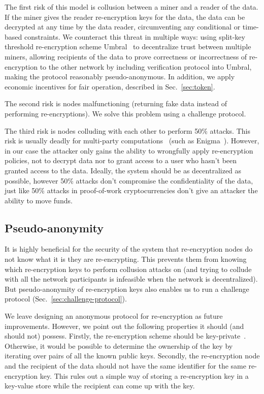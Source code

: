 \documentclass[longbibliography,nofootinbib]{revtex4-1}
\begin{document}
The first risk of this model is collusion between a miner and a reader of the data.
If the miner gives the reader re-encryption keys for the data,
the data can be decrypted at any time by the data reader, circumventing any conditional or time-based constraints.
We counteract this threat in multiple ways:
using split-key threshold re-encryption scheme Umbral~\cite{umbral-spec} to decentralize trust between multiple miners,
allowing recipients of the data to prove correctness or incorrectness of re-encryption to the other network by including verification protocol into Umbral,
making the protocol reasonably pseudo-anonymous.
In addition, we apply economic incentives for fair operation, described in Sec.~\ref{sec:token}.

The second risk is nodes malfunctioning (returning fake data instead of performing re-encryptions).
We solve this problem using a challenge protocol.

The third risk is nodes colluding with each other to perform 50\% attacks.
This risk is usually deadly for multi-party computations~\cite{vitalik-secret-dao} (such as Enigma~\cite{enigma}). However, in our case the attacker only gains the ability to wrongfully apply re-encryption policies, not to decrypt data nor to grant access to a user who hasn't been granted access to the data.
Ideally, the system should be as decentralized as possible, however 50\% attacks don't compromise the confidentiality of the data, just like 50\% attacks in
proof-of-work cryptocurrencies don't give an attacker the ability to move funds.

\subsection{Pseudo-anonymity}
\label{sec:anonymity}

It is highly beneficial for the security of the system that re-encryption nodes do not know what it is they are re-encrypting.
This prevents them from knowing which re-encryption keys to perform collusion attacks on (and trying to collude with all the network participants
is infeasible when the network is decentralized).
But pseudo-anonymity of re-encryption keys also enables us to run a challenge protocol (Sec.~\ref{sec:challenge-protocol}).

We leave designing an anonymous protocol for re-encryption as future improvements.
However, we point out the following properties it should (and should not) possess.
Firstly, the re-encryption scheme should be key-private~\cite{Ateniese-key-private,lwe-reencryption}.
Otherwise, it would be possible to determine the ownership of the key by iterating over pairs of all the known public keys.
Secondly, the re-encryption node and the recipient of the data should not have the same identifier for the same re-encryption key.
This rules out a simple way of storing a re-encryption key in a key-value store while the recipient can come up with the key.
\end{document}
